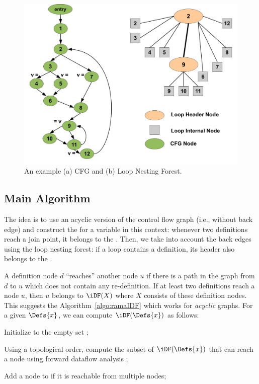 {    \begin{figure}[htb]
    \centerline{\includegraphics[scale=0.3]{lnfred.pdf}}
    \caption{An example (a) CFG and (b) Loop Nesting Forest.}
    \label{fig:lnf}
    \end{figure} 


\subsection{Main Algorithm}

The idea is to use an acyclic version of the control flow graph (i.e., without 
back edge) and construct the \iDF for a variable in this context: whenever two 
definitions reach a join point, it belongs to the \iDF. Then, we take into 
account the back edges using the loop nesting forest: if a loop contains a 
definition, its header also belongs to the \iDF.

\medskip
    
A definition node $d$ ``reaches'' another node $u$ if there is a path in the 
graph from $d$ to $u$ which does not contain any re-definition. If at least two 
definitions reach a node $u$, then $u$ belongs to $\iDF(X)$ where $X$ consists 
of these definition nodes. This suggests the Algorithm~\ref{algo:ramaIDF} which 
works for \emph{acyclic} graphs.
For a given $\Defs{x}$, we can compute $\iDF(\Defs{x})$ as follows:
\begin{itemize}
\item { Initialize \iDF to the empty set };
\item { Using a topological order, compute the subset of $\iDF(\Defs{x})$ that can reach a node using forward dataflow analysis };
{\item} {Add a node to \iDF if it is reachable from multiple nodes};
\end{itemize}  

}
